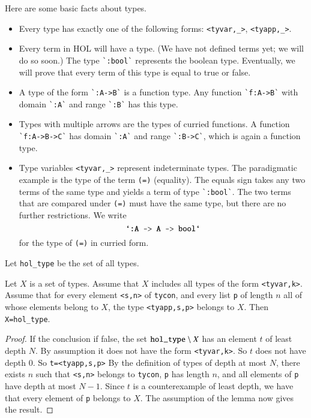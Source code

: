 Here are some basic facts about types.
\begin{itemize}
\item Every type has exactly one of the following forms:
\verb!<tyvar,_>!, \verb!<tyapp,_>!.
\item Every term in HOL will have a type. (We have not defined terms yet; we will do so soon.)
The type \verb!`:bool`! represents the boolean type.  Eventually, we will prove that every term of this type is equal to true or false.
\item A type of the form \verb!`:A->B`! is a function type.  Any function \verb!`f:A->B`! with domain \verb!`:A`! and range \verb!`:B`! has this type.
\item Types with multiple arrows are the types of curried functions.  A function \verb!`f:A->B->C`! has domain \verb!`:A`! and range \verb!`:B->C`!, which is again a function type.
\item Type variables \verb!<tyvar,_>! represent indeterminate types.   The paradigmatic example is the type of the term \verb!(=)! (equality).  The equals sign takes any two terms of the same type and yields a term of type \verb!`:bool`!.  The two terms that are compared under \verb!(=)! must have the same type, but there are no further restrictions.  We write
$$
\verb!`:A -> A -> bool`!
$$
for the type of \verb!(=)! in curried form.
\end{itemize}




Let \verb!hol_type! be the set of all types.


\begin{lemma}[induction]  Let $X$ is a set of types. Assume that $X$ includes all types of the form \verb!<tyvar,k>!.  Assume that for every element \verb!<s,n>! of \verb!tycon!, and every list \verb!p! of length $n$ all of whose elements belong to $X$, the type \verb!<tyapp,s,p>! belongs to $X$.  Then \verb!X=hol_type!.
\end{lemma}

\begin{proof} If the conclusion if false, the set $\verb!hol_type!\setminus X$ has an element $t$ of least depth $N$.  By assumption it does not have the form \verb!<tyvar,k>!.  So $t$ does not have depth $0$.  So \verb!t=<tyapp,s,p>!   By the definition of types of depth at most $N$, there exists $n$ such that \verb!<s,n>! belongs to \verb!tycon!, \verb!p! has length $n$, and all elements of \verb!p! have depth at most $N-1$.  Since $t$ is a counterexample of least depth, we have that every element of \verb!p! belongs to $X$.  The assumption of the lemma now gives the result.
\end{proof}



